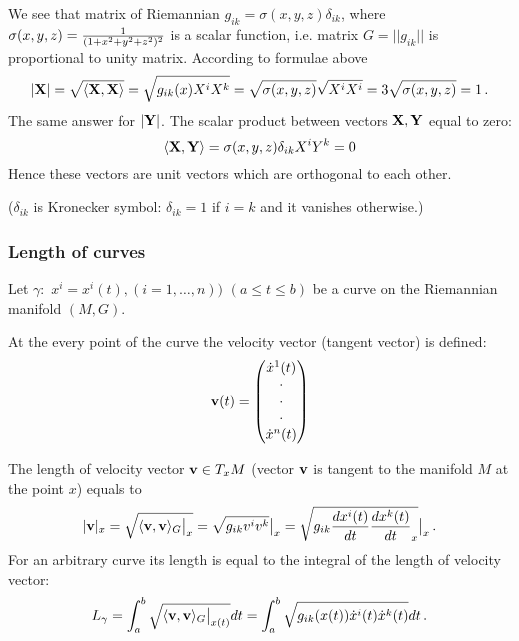 \documentclass[12pt]{article}
\theoremstyle{theorem}
\numberwithin{equation}{section}
\begin{document}
We see that matrix of Riemannian $g_{ik}=\sigma(x,y,z)\delta_{ik}$, where
$\sigma(x,y,z)={1\over (1+x^2+y^2+z^2)^2}$ is a scalar function,
i.e. matrix $G=||g_{ik}||$ is proportional to unity matrix.
According to formulae above
    $$
    |{\bf X}|=\sqrt {\langle {\bf X},{\bf X}\rangle}=\sqrt {g_{ik}(x)X^iX^k}=\sqrt {\sigma(x,y,z)}\sqrt {X^iX^i}=
    3\sqrt {\sigma(x,y,z)}=1\,.
    $$
The same answer for $|{\bf Y}|$. The scalar product between vectors
${\bf X},{\bf Y}$ equal to zero:
           $$
         \langle{\bf X},{\bf Y}\rangle=\sigma(x,y,z)\delta_{ik}X^iY^k=0
           $$
Hence these vectors are unit vectors which are
orthogonal to each other.

\noindent ($\delta_{ik}$ is Kronecker symbol: $\delta_{ik}=1$ if $i=k$
and it vanishes otherwise.)

\subsubsection {Length of  curves}

Let $\gamma\colon\,\, x^i=x^i(t), (i=1,\dots,n))$
 $(a\leq t\leq b)$ be a curve on the Riemannian manifold $(M,G)$.

  At the every point of the curve the velocity vector (tangent vector)
  is defined:
\begin{equation*}\label{velvector}
  {\bf v}(t)=\begin{pmatrix}
       \dot x^1 (t)\\
             \cdot\\
             \cdot\\
             \cdot\\
             \dot x^n(t)
         \end{pmatrix}
\end{equation*}

The length of velocity vector ${\bf v}\in T_xM$
(vector ${\bf v}$ is tangent to the manifold $M$ at the point $x$)
equals to
     \begin{equation*}\label{speedforaunt}
       |{\bf v}|_x=\sqrt {\langle {\bf v},{\bf v}\rangle_G\big\vert_{x}}=
       \sqrt{g_{ik}v^iv^k}\big\vert_{x}=
       \sqrt{g_{ik}{dx^i(t)\over dt}{dx^k(t)\over dt}_x}\big\vert_{x}\,.
     \end{equation*}
For an arbitrary curve its length is equal
 to the integral of the length of velocity vector:
\begin{equation}\label{lengthofthecurve}
  L_\gamma=\int_a^b \sqrt {\langle{\bf v},{\bf v}\rangle_G\big\vert_{x(t)}}dt=
  \int_a^b \sqrt {g_{ik}(x(t))\dot x^i(t) \dot x^k(t)}dt\,.
\end{equation}
\end{document}

